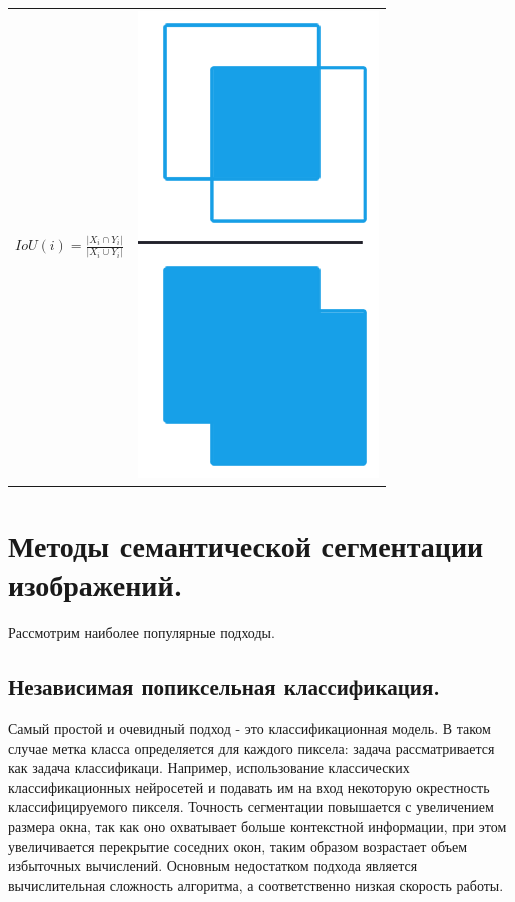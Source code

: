 \documentclass{article}
\begin{document}
\begin{table}[]
\centering
    \centering
    \begin{tabular}{c c}
        $IoU(i) = \frac{|X_i \cap Y_i|}{|X_i \cup Y_i|}$ &  \includegraphics[scale=0.2, angle=90]{iou_equation.png}
    \end{tabular}
\end{table}


\section{Методы семантической сегментации изображений.}
Рассмотрим наиболее популярные подходы. 

\subsection{Независимая попиксельная классификация.}
Самый простой и очевидный подход - это классификационная модель. В таком случае метка класса определяется для каждого пиксела: задача рассматривается как задача  классификаци. Например, использование классических классификационных нейросетей и подавать им на вход некоторую окрестность классифицируемого пикселя. Точность сегментации повышается с увеличением размера окна, так как оно охватывает больше контекстной информации, при этом увеличивается перекрытие соседних окон, таким образом возрастает объем избыточных вычислений. Основным недостатком подхода является вычислительная сложность алгоритма, а соответственно низкая скорость работы.
\end{document}
